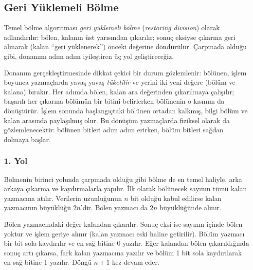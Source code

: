 \subsection{Geri Yüklemeli Bölme}
\label{sec:geri-yuklemeli-bolme}

Temel bölme algoritması \emph{geri yüklemeli bölme} (\emph{restoring division}) olarak adlandırılır: bölen, kalanın üst yarısından çıkarılır; sonuç eksiyse çıkarma geri alınarak (kalan ``geri yüklenerek'') önceki değerine döndürülür. Çarpmada olduğu gibi, donanımı adım adım iyileştiren üç yol geliştireceğiz.

Donanım gerçekleştirmesinde dikkat çekici bir durum gözlemlenir: bölünen, işlem boyunca yazmaçlarda yavaş yavaş \emph{tüketilir} ve yerini iki yeni değere (bölüm ve kalana) bırakır. Her adımda bölen, kalan ara değerinden çıkarılmaya çalışılır; başarılı her çıkarma bölümün bir bitini belirlerken bölünenin o kısmını da dönüştürür. İşlem sonunda başlangıçtaki bölünen ortadan kalkmış, bilgi bölüm ve kalan arasında paylaşılmış olur. Bu dönüşüm yazmaçlarda fiziksel olarak da gözlemlenecektir: bölünen bitleri adım adım erirken, bölüm bitleri sağdan dolmaya başlar.

\subsubsection{1. Yol}

Bölmenin birinci yolunda çarpmada olduğu gibi bölme de en temel haliyle, arka arkaya çıkarma ve kaydırmalarla yapılır. İlk olarak bölünecek sayının tümü kalan yazmacına atılır. Verilerin uzunluğunun $n$ bit olduğu kabul edilirse kalan yazmacının büyüklüğü $2n$'dir. Bölen yazmacı da $2n$ büyüklüğünde alınır.

Bölen yazmacındaki değer kalandan çıkarılır. Sonuç eksi ise sayının içinde bölen yoktur ve işlem geriye alınır (kalan yazmacı eski haline getirilir). Bölüm yazmacı bir bit sola kaydırılır ve en sağ bitine 0 yazılır. Eğer kalandan bölen çıkarıldığında sonuç artı çıkarsa, fark kalan yazmacına yazılır ve bölüm 1 bit sola kaydırılarak en sağ bitine 1 yazılır. Döngü $n+1$ kez devam eder.

